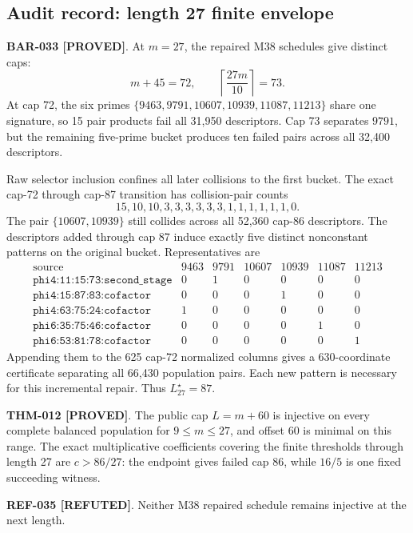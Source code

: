 \documentclass[11pt]{article}
\newcommand{\claimstatus}[2]{\textbf{#1 [#2]}}
\begin{document}
\subsection{Audit record: length 27 finite envelope}

\claimstatus{BAR-033}{PROVED}. At \(m=27\), the repaired M38 schedules give
distinct caps:
\[
m+45=72,\qquad
\left\lceil\frac{27m}{10}\right\rceil=73.
\]
At cap 72, the six primes
\(\{9463,9791,10607,10939,11087,11213\}\) share one signature, so 15
pair products fail all 31,950 descriptors. Cap 73 separates \(9791\), but
the remaining five-prime bucket produces ten failed pairs across all 32,400
descriptors.

Raw selector inclusion confines all later collisions to the first bucket.
The exact cap-72 through cap-87 transition has collision-pair counts
\[
15,10,10,3,3,3,3,3,3,1,1,1,1,1,1,0.
\]
The pair \(\{10607,10939\}\) still collides across all 52,360 cap-86
descriptors. The descriptors added through cap 87 induce exactly five
distinct nonconstant patterns on the original bucket. Representatives are
\[
\begin{array}{c|cccccc}
\text{source}&9463&9791&10607&10939&11087&11213\\
\hline
\texttt{phi4:11:15:73:second\_stage}&0&1&0&0&0&0\\
\texttt{phi4:15:87:83:cofactor}&0&0&0&1&0&0\\
\texttt{phi4:63:75:24:cofactor}&1&0&0&0&0&0\\
\texttt{phi6:35:75:46:cofactor}&0&0&0&0&1&0\\
\texttt{phi6:53:81:78:cofactor}&0&0&0&0&0&1
\end{array}
\]
Appending them to the 625 cap-72 normalized columns gives a 630-coordinate
certificate separating all 66,430 population pairs. Each new pattern is
necessary for this incremental repair. Thus \(L_{27}^\star=87\).

\claimstatus{THM-012}{PROVED}. The public cap \(L=m+60\) is injective on
every complete balanced population for \(9\le m\le27\), and offset 60 is
minimal on this range. The exact multiplicative coefficients covering the
finite thresholds through length 27 are \(c>86/27\): the endpoint gives
failed cap 86, while \(16/5\) is one fixed succeeding witness.

\claimstatus{REF-035}{REFUTED}. Neither M38 repaired schedule remains
injective at the next length.
\end{document}
